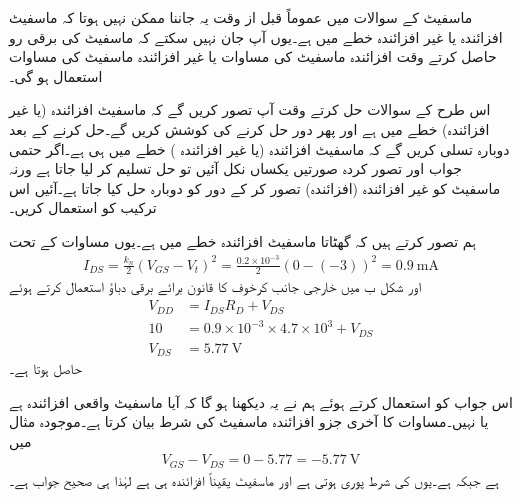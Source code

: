ماسفیٹ کے سوالات میں عموماً قبل از وقت یہ جاننا ممکن نہیں ہوتا کہ ماسفیٹ افزائندہ یا غیر افزائندہ خطے میں ہے۔یوں آپ جان نہیں سکتے کہ ماسفیٹ کی برقی رو حاصل کرتے وقت افزائندہ ماسفیٹ کی مساوات یا غیر افزائندہ ماسفیٹ کی مساوات استعمال ہو گی۔

اس طرح کے سوالات حل کرتے وقت آپ تصور کریں گے کہ ماسفیٹ افزائندہ (یا غیر افزائندہ) خطے میں ہے اور پھر دور حل کرنے کی کوشش کریں گے۔حل کرنے کے بعد دوبارہ تسلی کریں گے کہ ماسفیٹ افزائندہ (یا غیر افزائندہ ) خطے میں ہی ہے۔اگر حتمی جواب اور تصور کردہ صورتیں یکساں نکل آئیں تو حل تسلیم کر لیا جاتا ہے ورنہ ماسفیٹ کو غیر افزائندہ (افزائندہ) تصور کر کے دور کو دوبارہ حل کیا جاتا ہے۔آئیں اس ترکیب کو استعمال کریں۔

ہم تصور کرتے ہیں کہ گھٹاتا ماسفیٹ افزائندہ خطے میں ہے۔یوں مساوات   کے تحت
\begin{align*}
I_{DS}=\frac{k_n}{2} \left(V_{GS}-V_t \right )^{2}=\frac{0.2 \times 10^{-3}}{2} \left(0-(-3) \right )^2 =\SI{0.9}{\milli \ampere}
\end{align*}
اور شکل  ب میں خارجی جانب کرخوف کا قانون برائے برقی دباؤ استعمال کرتے ہوئے
\begin{align*}
V_{DD}&=I_{DS} R_D+V_{DS}\\
10&=0.9 \times 10^{-3} \times 4.7 \times 10^{3}+V_{DS}\\
V_{DS}&=\SI{5.77}{\volt}
\end{align*}
حاصل ہوتا ہے۔

اس جواب کو استعمال کرتے ہوئے ہم نے یہ دیکھنا ہو گا کہ آیا ماسفیٹ واقعی افزائندہ ہے یا نہیں۔مساوات   کا آخری جزو افزائندہ ماسفیٹ کی شرط بیان کرتا ہے۔موجودہ مثال میں
\begin{align*}
V_{GS}-V_{DS}=0-5.77=\SI{-5.77}{\volt}
\end{align*}
ہے جبکہ   ہے۔یوں   کی شرط پوری ہوتی ہے اور ماسفیٹ یقیناً افزائندہ ہی ہے لہٰذا  ہی صحیح جواب ہے۔

